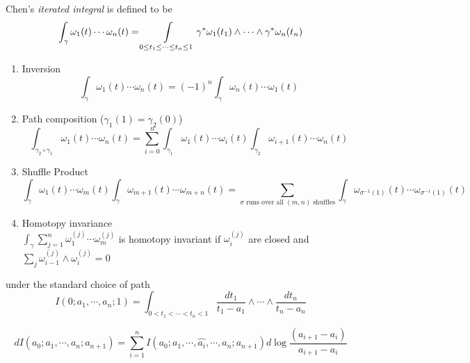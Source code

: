 \documentclass[main]{subfiles}
\begin{document}
\begin{definition}
Chen's \textit{iterated integral} is defined to be
\[\int_\gamma\omega_1(t)\cdots\omega_n(t)=\int\displaylimits_{0\leq t_1\leq\cdots\leq t_n\leq 1}\gamma^*\omega_1(t_1)\wedge\cdots\wedge\gamma^*\omega_n(t_n)\]
\end{definition}

\begin{theorem}\cite{Zhao_MultipleZetaFunctionsMultiplePolylogarithmsAndTheirSpecialValues}
\begin{enumerate}[leftmargin=*]
\item Inversion
\[\int_\gamma\omega_1(t)\cdots\omega_n(t)=(-1)^n\int_\gamma\omega_n(t)\cdots\omega_1(t)\]
\item Path composition ($\gamma_1(1)=\gamma_2(0)$)
\[\int_{\gamma_2\circ\gamma_1}\omega_1(t)\cdots\omega_n(t)=\sum_{i=0}^n\int_{\gamma_1}\omega_1(t)\cdots\omega_i(t)\int_{\gamma_2}\omega_{i+1}(t)\cdots\omega_n(t)\]
\item Shuffle Product
\[\int_{\gamma}\omega_1(t)\cdots\omega_m(t)\int_{\gamma}\omega_{m+1}(t)\cdots\omega_{m+n}(t)=\sum_{\sigma\text{ runs over all $(m,n)$ shuffles}}\int_{\gamma}\omega_{\sigma^{-1}(1)}(t)\cdots\omega_{\sigma^{-1}(1)}(t)\]
\item Homotopy invariance \\
$\displaystyle\int_\gamma\sum_{j=1}^n\omega_1^{(j)}\cdots\omega_m^{(j)}$ is homotopy invariant if $\omega_i^{(j)}$ are closed and $\displaystyle\sum_j\omega_{i-1}^{(j)}\wedge\omega_i^{(j)}=0$
\end{enumerate}
\end{theorem}

under the standard choice of path
\[I(0;a_1,\cdots,a_n;1)=\int_{0<t_1<\cdots<t_n<1}\frac{dt_1}{t_1-a_1}\wedge\cdots\wedge\frac{dt_n}{t_n-a_n}\]

\begin{theorem}
\[dI(a_0;a_1,\cdots,a_n;a_{n+1})=\sum_{i=1}^nI(a_0;a_1,\cdots,\widehat{a_i},\cdots,a_n;a_{n+1})d\log\frac{(a_{i+1}-a_i)}{a_{i+1}-a_i}\]
\end{theorem}
\end{document}

